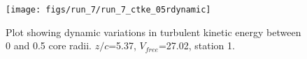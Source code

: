 \begin{figure}[H]
\centering
\texttt{[image: figs/run\_7/run\_7\_ctke\_05rdynamic]}
\caption{Plot showing dynamic variations in turbulent kinetic energy between 0 and 0.5 core radii. $z/c$=5.37, $V_{free}$=27.02, station 1.}
\label{fig:run_7_ctke_05rdynamic}
\end{figure}


